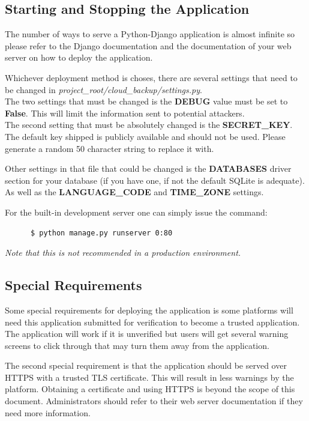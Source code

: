 \documentclass{article}
\begin{document}
      \subsection{Starting and Stopping the Application}
      The number of ways to serve a Python-Django application is almost infinite so please refer to the Django documentation and the documentation of your web server on how to deploy the application.

      Whichever deployment method is choses, there are several settings that need to be changed in \textit{project\_root/cloud\_backup/settings.py}. \\
      The two settings that must be changed is the \textbf{DEBUG} value must be set to \textbf{False}. This will limit the information sent to potential attackers. \\
      The second setting that must be absolutely changed is the \textbf{SECRET\_KEY}. The default key shipped is publicly available and should not be used. Please generate a random 50 character string to replace it with.

      Other settings in that file that could be changed is the \textbf{DATABASES} driver section for your database (if you have one, if not the default SQLite is adequate). As well as the \textbf{LANGUAGE\_CODE} and
      \textbf{TIME\_ZONE} settings.

      For the built-in development server one can simply issue the command:
      \begin{verbatim}
      $ python manage.py runserver 0:80
      \end{verbatim}

      \textit{Note that this is not recommended in a production environment.}

      \subsection{Special Requirements}
      Some special requirements for deploying the application is some platforms will need this application submitted for verification to become a trusted application. The application will work if it is unverified but users will
      get several warning screens to click through that may turn them away from the application.

      The second special requirement is that the application should be served over HTTPS with a trusted TLS certificate. This will result in less warnings by the platform. Obtaining a certificate and using HTTPS is beyond the scope
      of this document. Administrators should refer to their web server documentation if they need more information.
\end{document}
